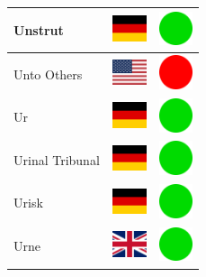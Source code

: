 \documentclass[12pt, a4paper, twoside]{report}
\begin{document}
\begin{center}
\begin{longtable}{|p{5cm}|p{2cm}|p{2cm}|}
 Unstrut                                                    & \includegraphics[width=1cm]{../img/flags/de} &   \includegraphics[width=1cm]{../likes/y} \\ \hline
 Unto Others                                                & \includegraphics[width=1cm]{../img/flags/us} &   \includegraphics[width=1cm]{../likes/n} \\ \hline
 Ur                                                         & \includegraphics[width=1cm]{../img/flags/de} &   \includegraphics[width=1cm]{../likes/y} \\ \hline
 Urinal Tribunal                                            & \includegraphics[width=1cm]{../img/flags/de} &   \includegraphics[width=1cm]{../likes/y} \\ \hline
 Urisk                                                      & \includegraphics[width=1cm]{../img/flags/de} &   \includegraphics[width=1cm]{../likes/y} \\ \hline
 Urne                                                       & \includegraphics[width=1cm]{../img/flags/gb} &   \includegraphics[width=1cm]{../likes/y} \\ \hline

\end{longtable}
\end{center}
\end{document}
